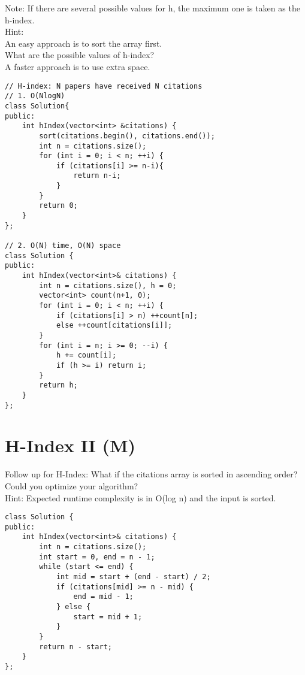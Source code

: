 Note: If there are several possible values for h, the maximum one is taken as the h-index.\\

Hint:\\
    An easy approach is to sort the array first.\\
    What are the possible values of h-index?\\
    A faster approach is to use extra space.\\

\begin{lstlisting}
// H-index: N papers have received N citations
// 1. O(NlogN)
class Solution{
public:    
    int hIndex(vector<int> &citations) {
        sort(citations.begin(), citations.end());
        int n = citations.size();
        for (int i = 0; i < n; ++i) {
            if (citations[i] >= n-i){
                return n-i;    
            } 
        }
        return 0;
    }    
};

// 2. O(N) time, O(N) space
class Solution {
public:
    int hIndex(vector<int>& citations) {
        int n = citations.size(), h = 0;
        vector<int> count(n+1, 0);
        for (int i = 0; i < n; ++i) {
            if (citations[i] > n) ++count[n];
            else ++count[citations[i]];
        }
        for (int i = n; i >= 0; --i) {
            h += count[i];
            if (h >= i) return i;
        }
        return h;
    }
};
\end{lstlisting}


\section{H-Index II (M)}
Follow up for H-Index: What if the citations array is sorted in ascending order? Could you optimize your algorithm? \\

Hint: Expected runtime complexity is in O(log n) and the input is sorted.\\

\begin{lstlisting}
class Solution {
public:
    int hIndex(vector<int>& citations) {
        int n = citations.size();
        int start = 0, end = n - 1;
        while (start <= end) {
            int mid = start + (end - start) / 2;
            if (citations[mid] >= n - mid) {
                end = mid - 1;
            } else {
                start = mid + 1;
            }
        }
        return n - start;
    }
};
\end{lstlisting}


